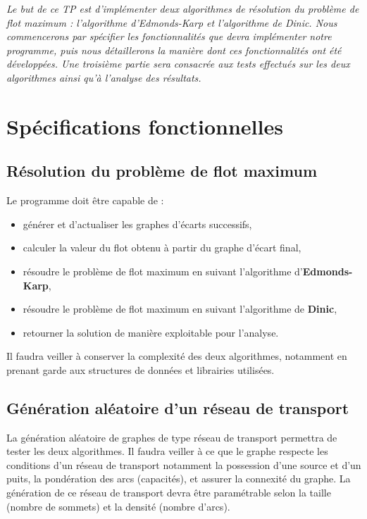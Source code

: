 \textit{Le but de ce TP est d'implémenter deux algorithmes de résolution du problème de flot maximum : l'algorithme d'Edmonds-Karp et l'algorithme de Dinic. Nous commencerons par spécifier les fonctionnalités que devra implémenter notre programme, puis nous détaillerons la manière dont ces fonctionnalités ont été développées. Une troisième partie sera consacrée aux tests effectués sur les deux algorithmes ainsi qu'à l'analyse des résultats.}

\pagebreak

\section{Spécifications fonctionnelles}

\subsection{Résolution du problème de flot maximum}

Le programme doit être capable de :
\begin{itemize}
\item générer et d'actualiser les graphes d'écarts successifs,
\item calculer la valeur du flot obtenu à partir du graphe d'écart final,
\item résoudre le problème de flot maximum en suivant l'algorithme d'\textbf{Edmonds-Karp},
\item résoudre le problème de flot maximum en suivant l'algorithme de \textbf{Dinic},
\item retourner la solution de manière exploitable pour l'analyse.
\end{itemize}

Il faudra veiller à conserver la complexité des deux algorithmes, notamment en prenant garde aux structures de données et librairies utilisées.

\subsection{Génération aléatoire d'un réseau de transport}

La génération aléatoire de graphes de type réseau de transport permettra de tester les deux algorithmes. Il faudra veiller à ce que le graphe respecte les conditions d'un réseau de transport notamment la possession d'une source et d'un puits, la pondération des arcs (capacités), et assurer la connexité du graphe. La génération de ce réseau de transport devra être paramétrable selon la taille (nombre de sommets) et la densité (nombre d'arcs).

